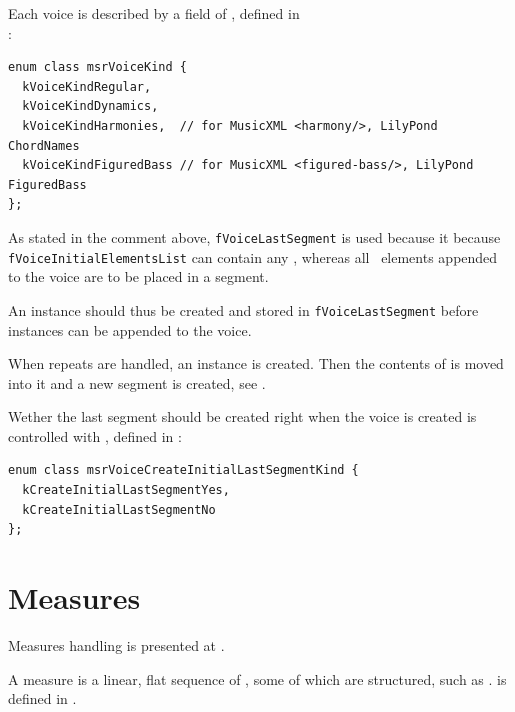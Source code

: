 Each voice is described by a field of , defined in\\
:
\begin{lstlisting}[language=CPlusPlus]
enum class msrVoiceKind {
  kVoiceKindRegular,
  kVoiceKindDynamics,
  kVoiceKindHarmonies,  // for MusicXML <harmony/>, LilyPond ChordNames
  kVoiceKindFiguredBass // for MusicXML <figured-bass/>, LilyPond FiguredBass
};
\end{lstlisting}

As stated in the comment above, {\tt fVoiceLastSegment} is used because it because {\tt fVoiceInitialElementsList} can contain any , whereas all \msrRepr\ elements appended to the voice are to be placed in a segment.

An  instance should thus be created and stored in {\tt fVoiceLastSegment} before  instances can be appended to the voice.

When repeats are handled, an  instance is created. Then the contents of  is moved into it and a new segment is created, see .%

Wether the last segment should be created right when the voice is created is controlled with , defined in :
\begin{lstlisting}[language=CPlusPlus]
enum class msrVoiceCreateInitialLastSegmentKind {
  kCreateInitialLastSegmentYes,
  kCreateInitialLastSegmentNo
};
\end{lstlisting}


\section{Measures}\label{Measures}

Measures handling is presented at .

A measure is a linear, flat sequence of , some of which are structured, such as .  is defined in .


